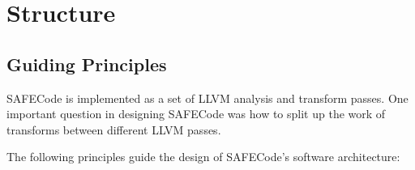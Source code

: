 \section{Structure}
\label{section:struct}

\subsection{Guiding Principles}
\label{section:struct:principles}

SAFECode is implemented as a set of LLVM analysis and transform
passes.  One important question in designing SAFECode was how to split
up the work of transforms between different LLVM passes.

The following principles guide the design of SAFECode's software
architecture:


